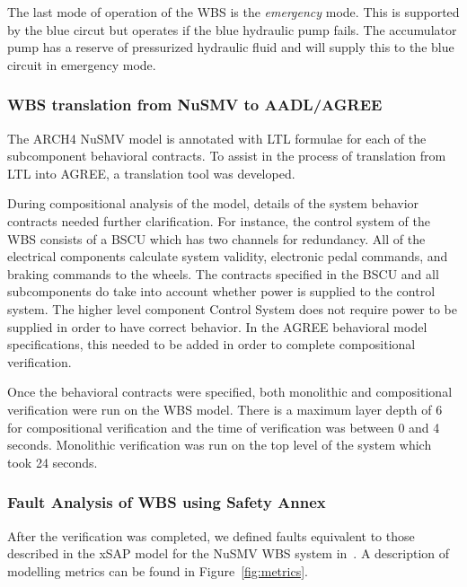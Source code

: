 The last mode of operation of the WBS is the \textit{emergency} mode. This is supported by the blue circut but operates if the blue hydraulic pump fails. The accumulator pump has a reserve of pressurized hydraulic fluid and will supply this to the blue circuit in emergency mode. 

\subsubsection{WBS translation from NuSMV to AADL/AGREE}
The ARCH4 NuSMV model is annotated with LTL formulae for each of the subcomponent behavioral contracts. To assist in the process of translation from LTL into AGREE, a translation tool was developed. 

During compositional analysis of the model, details of the system behavior contracts needed further clarification. For instance, the control system of the WBS consists of a BSCU which has two channels for redundancy. All of the electrical components calculate system validity, electronic pedal commands, and braking commands to the wheels. The contracts specified in the BSCU and all subcomponents do take into account whether power is supplied to the control system. The higher level component Control System does not require power to be supplied in order to have correct behavior. In the AGREE behavioral model specifications, this needed to be added in order to complete compositional verification. 

Once the behavioral contracts were specified, both monolithic and compositional verification were run on the WBS model. There is a maximum layer depth of 6 for compositional verification and the time of verification was between 0 and 4 seconds. Monolithic verification was run on the top level of the system which took 24 seconds. 

\subsubsection{Fault Analysis of WBS using Safety Annex}
After the verification was completed, we defined faults equivalent to those described in the xSAP model for the NuSMV WBS system in~\cite{DBLP:conf/cav/BozzanoCPJKPRT15}. A description of modelling metrics can be found in Figure~\ref{fig:metrics}.

